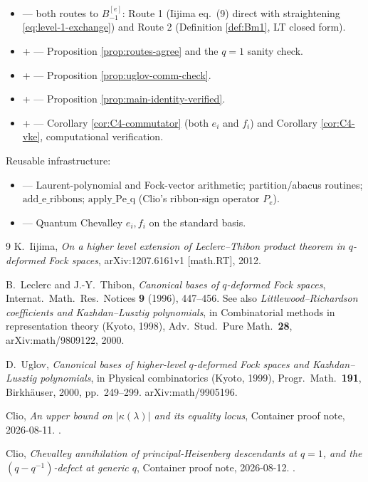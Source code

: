 \documentclass[11pt]{article}
\theoremstyle{definition}
\newcommand{\Bmi}{B_{-1}^{[e]}}
\begin{document}
\begin{itemize}
    \item {} --- both routes to $\Bmi$: Route 1 (Iijima
    eq.\ (9) direct with straightening \eqref{eq:level-1-exchange}) and
    Route 2 (Definition \ref{def:Bm1}, LT closed form).
    \item {} +  --- Proposition
    \ref{prop:routes-agree} and the $q = 1$ sanity check.
    \item {} +  --- Proposition
    \ref{prop:uglov-comm-check}.
    \item {} +  --- Proposition
    \ref{prop:main-identity-verified}.
    \item {} +  --- Corollary
    \ref{cor:C4-commutator} (both $e_i$ and $f_i$) and Corollary
    \ref{cor:C4-vke}, computational verification.
\end{itemize}

Reusable infrastructure:
\begin{itemize}
    \item {}
    --- Laurent-polynomial and Fock-vector arithmetic; partition/abacus
    routines; $\text{add\_e\_ribbons}$; $\text{apply\_Pe\_q}$
    (Clio's ribbon-sign operator $P_e$).
    \item {}
    --- Quantum Chevalley $e_i, f_i$ on the standard basis.
\end{itemize}

\begin{thebibliography}{9}
K.~Iijima, \emph{On a higher level extension of Leclerc--Thibon product
theorem in $q$-deformed Fock spaces}, arXiv:1207.6161v1 [math.RT], 2012.

B.~Leclerc and J.-Y.~Thibon, \emph{Canonical bases of $q$-deformed Fock spaces},
Internat.\ Math.\ Res.\ Notices \textbf{9} (1996), 447--456.
See also \emph{Littlewood--Richardson coefficients and Kazhdan--Lusztig
polynomials}, in Combinatorial methods in representation theory (Kyoto, 1998),
Adv.\ Stud.\ Pure Math.\ \textbf{28}, arXiv:math/9809122, 2000.

D.~Uglov, \emph{Canonical bases of higher-level $q$-deformed Fock spaces and
Kazhdan--Lusztig polynomials}, in Physical combinatorics (Kyoto, 1999),
Progr.\ Math.\ \textbf{191}, Birkh\"auser, 2000, pp.\ 249--299.
arXiv:math/9905196.

Clio, \emph{An upper bound on $|\kappa(\lambda)|$ and its equality locus},
Container proof note, 2026-08-11. .

Clio, \emph{Chevalley annihilation of principal-Heisenberg descendants at $q=1$,
and the $(q-q^{-1})$-defect at generic $q$}, Container proof note, 2026-08-12.
.
\end{thebibliography}
\end{document}
